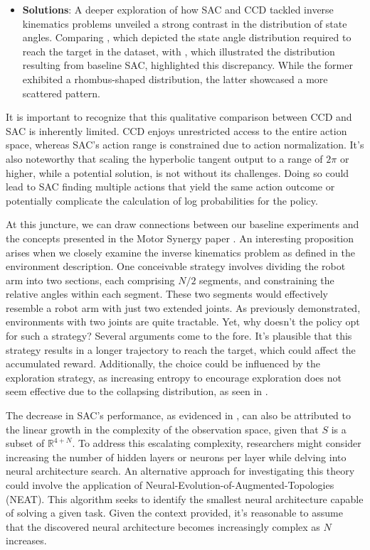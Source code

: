 \begin{itemize}
    \item \textbf{Solutions}: A deeper exploration of how SAC and CCD tackled inverse kinematics problems unveiled a strong contrast in the distribution of state angles. Comparing , which depicted the state angle distribution required to reach the target in the dataset, with , which illustrated the distribution resulting from baseline SAC, highlighted this discrepancy. While the former exhibited a rhombus-shaped distribution, the latter showcased a more scattered pattern.
\end{itemize}

It is important to recognize that this qualitative comparison between CCD and SAC is inherently limited. CCD enjoys unrestricted access to the entire action space, whereas SAC's action range is constrained due to action normalization. It's also noteworthy that scaling the hyperbolic tangent output to a range of $2\pi$ or higher, while a potential solution, is not without its challenges. Doing so could lead to SAC finding multiple actions that yield the same action outcome or potentially complicate the calculation of log probabilities for the policy.

At this juncture, we can draw connections between our baseline experiments and the concepts presented in the Motor Synergy paper \cite{Motor_Synergy_Learning}. An interesting proposition arises when we closely examine the inverse kinematics problem as defined in the environment description. One conceivable strategy involves dividing the robot arm into two sections, each comprising $N/2$ segments, and constraining the relative angles within each segment. These two segments would effectively resemble a robot arm with just two extended joints. As previously demonstrated, environments with two joints are quite tractable. Yet, why doesn't the policy opt for such a strategy? Several arguments come to the fore. It's plausible that this strategy results in a longer trajectory to reach the target, which could affect the accumulated reward. Additionally, the choice could be influenced by the exploration strategy, as increasing entropy to encourage exploration does not seem effective due to the collapsing distribution, as seen in .

The decrease in SAC's performance, as evidenced in , can also be attributed to the linear growth in the complexity of the observation space, given that $S$ is a subset of $\mathbb{R}^{4+N}$. To address this escalating complexity, researchers might consider increasing the number of hidden layers or neurons per layer while delving into neural architecture search. An alternative approach for investigating this theory could involve the application of Neural-Evolution-of-Augmented-Topologies (NEAT). This algorithm seeks to identify the smallest neural architecture capable of solving a given task. Given the context provided, it's reasonable to assume that the discovered neural architecture becomes increasingly complex as $N$ increases.




